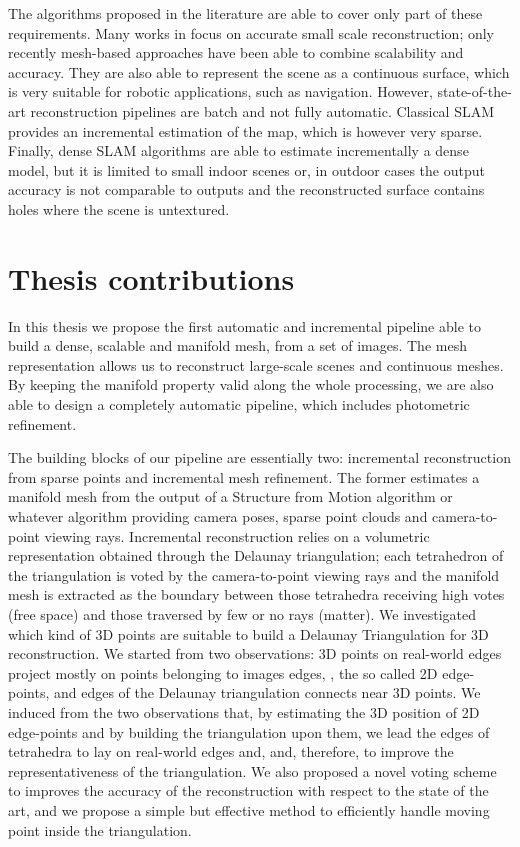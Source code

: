 The algorithms proposed in the literature are able to cover only part of these requirements.
Many works in \mvs focus on accurate small scale reconstruction; only recently mesh-based approaches have been able to combine scalability and accuracy. They are also able to represent the scene as  a continuous surface, which is very suitable for robotic applications, such as navigation.
However, state-of-the-art \mvs reconstruction pipelines are batch and not fully automatic. 
Classical SLAM provides an incremental estimation of the map, which is however very sparse.
Finally, dense SLAM algorithms are able to estimate incrementally a dense model, but it is limited to small indoor scenes or, in outdoor cases the output accuracy is not comparable to \mvs outputs and the reconstructed surface contains holes where the scene is untextured.

\section{Thesis contributions}
In this thesis we propose the first automatic and incremental pipeline able to build a dense, scalable and manifold mesh, from a set of images.
The mesh representation allows us  to reconstruct  large-scale scenes and continuous meshes.
By keeping the manifold property valid along the whole processing, we are also able to design a completely automatic pipeline, which includes photometric refinement.

The building blocks of our pipeline are essentially two: incremental reconstruction from sparse points and incremental mesh refinement.
The former estimates a  manifold mesh from the output of a Structure from Motion algorithm or whatever algorithm providing camera poses, sparse point clouds and camera-to-point viewing rays.
Incremental reconstruction relies on a volumetric representation obtained through the Delaunay triangulation; each tetrahedron of the triangulation  is voted by the camera-to-point viewing rays and the manifold mesh is extracted as the boundary between those tetrahedra receiving high votes (free space) and those traversed by few or no rays (matter).
We investigated which kind of 3D points are suitable to build a Delaunay Triangulation for 3D reconstruction.
We started from two observations: 3D points on real-world edges project mostly on  points belonging to images edges, \ie, the so called 2D edge-points, and edges of the Delaunay triangulation connects near 3D points.
We induced from the two observations that, by estimating the 3D position of 2D edge-points and by building the triangulation upon them, we lead the edges of tetrahedra  to lay on real-world edges and, and, therefore, to improve the representativeness of the triangulation.
We also proposed a novel voting scheme to improves the accuracy of the reconstruction with respect to the state of the art, and we propose a simple but effective method to efficiently handle moving point inside the triangulation.


